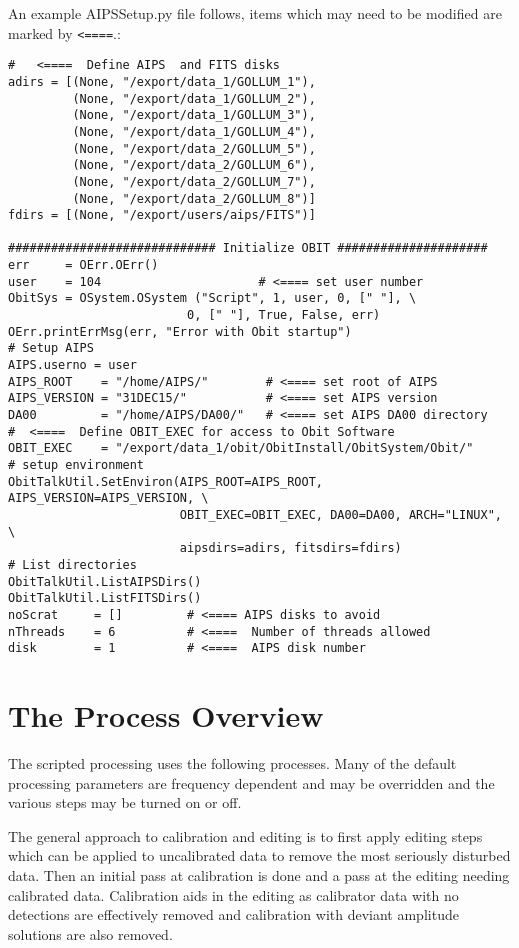 \documentclass[11pt]{article}
\begin{document}
An example AIPSSetup.py file follows, items which may need to be
modified are marked by {\tt <====}.:
\begin{verbatim}
#   <====  Define AIPS  and FITS disks
adirs = [(None, "/export/data_1/GOLLUM_1"),
         (None, "/export/data_1/GOLLUM_2"),
         (None, "/export/data_1/GOLLUM_3"),
         (None, "/export/data_1/GOLLUM_4"),
         (None, "/export/data_2/GOLLUM_5"),
         (None, "/export/data_2/GOLLUM_6"),
         (None, "/export/data_2/GOLLUM_7"),
         (None, "/export/data_2/GOLLUM_8")]
fdirs = [(None, "/export/users/aips/FITS")]

############################# Initialize OBIT #####################
err     = OErr.OErr()
user    = 104                      # <==== set user number
ObitSys = OSystem.OSystem ("Script", 1, user, 0, [" "], \
                         0, [" "], True, False, err)
OErr.printErrMsg(err, "Error with Obit startup")
# Setup AIPS
AIPS.userno = user
AIPS_ROOT    = "/home/AIPS/"        # <==== set root of AIPS
AIPS_VERSION = "31DEC15/"           # <==== set AIPS version
DA00         = "/home/AIPS/DA00/"   # <==== set AIPS DA00 directory
#  <====  Define OBIT_EXEC for access to Obit Software 
OBIT_EXEC    = "/export/data_1/obit/ObitInstall/ObitSystem/Obit/"
# setup environment
ObitTalkUtil.SetEnviron(AIPS_ROOT=AIPS_ROOT, AIPS_VERSION=AIPS_VERSION, \
                        OBIT_EXEC=OBIT_EXEC, DA00=DA00, ARCH="LINUX", \
                        aipsdirs=adirs, fitsdirs=fdirs)
# List directories
ObitTalkUtil.ListAIPSDirs()
ObitTalkUtil.ListFITSDirs()
noScrat     = []         # <==== AIPS disks to avoid 
nThreads    = 6          # <====  Number of threads allowed
disk        = 1          # <====  AIPS disk number
\end{verbatim}

\section{The Process Overview}

The scripted processing uses the following processes.
Many of the default processing parameters are frequency dependent and
may be overridden and the various steps may be turned on or off.

The general approach to calibration and editing is to first apply
editing steps which can be applied to uncalibrated data to remove the
most seriously disturbed data.
Then an initial pass at calibration is done and a pass at the editing
needing calibrated data.
Calibration aids in the editing as calibrator data with no detections
are effectively removed and calibration with deviant amplitude
solutions are also removed.
\end{document}
